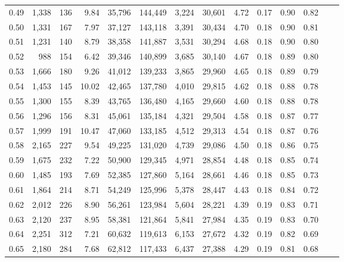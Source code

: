 \begin{tabular}{rrrrrrrrrrrrrr}
0.49 &  1,338 &    136 &    9.84 &   35,796 &  144,449 &   3,224 &  30,601 &  4.72 &  0.17 &  0.90 &      0.82 \\
0.50 &  1,331 &    167 &    7.97 &   37,127 &  143,118 &   3,391 &  30,434 &  4.70 &  0.18 &  0.90 &      0.81 \\
0.51 &  1,231 &    140 &    8.79 &   38,358 &  141,887 &   3,531 &  30,294 &  4.68 &  0.18 &  0.90 &      0.80 \\
0.52 &    988 &    154 &    6.42 &   39,346 &  140,899 &   3,685 &  30,140 &  4.67 &  0.18 &  0.89 &      0.80 \\
0.53 &  1,666 &    180 &    9.26 &   41,012 &  139,233 &   3,865 &  29,960 &  4.65 &  0.18 &  0.89 &      0.79 \\
0.54 &  1,453 &    145 &   10.02 &   42,465 &  137,780 &   4,010 &  29,815 &  4.62 &  0.18 &  0.88 &      0.78 \\
0.55 &  1,300 &    155 &    8.39 &   43,765 &  136,480 &   4,165 &  29,660 &  4.60 &  0.18 &  0.88 &      0.78 \\
0.56 &  1,296 &    156 &    8.31 &   45,061 &  135,184 &   4,321 &  29,504 &  4.58 &  0.18 &  0.87 &      0.77 \\
0.57 &  1,999 &    191 &   10.47 &   47,060 &  133,185 &   4,512 &  29,313 &  4.54 &  0.18 &  0.87 &      0.76 \\
0.58 &  2,165 &    227 &    9.54 &   49,225 &  131,020 &   4,739 &  29,086 &  4.50 &  0.18 &  0.86 &      0.75 \\
0.59 &  1,675 &    232 &    7.22 &   50,900 &  129,345 &   4,971 &  28,854 &  4.48 &  0.18 &  0.85 &      0.74 \\
0.60 &  1,485 &    193 &    7.69 &   52,385 &  127,860 &   5,164 &  28,661 &  4.46 &  0.18 &  0.85 &      0.73 \\
0.61 &  1,864 &    214 &    8.71 &   54,249 &  125,996 &   5,378 &  28,447 &  4.43 &  0.18 &  0.84 &      0.72 \\
0.62 &  2,012 &    226 &    8.90 &   56,261 &  123,984 &   5,604 &  28,221 &  4.39 &  0.19 &  0.83 &      0.71 \\
0.63 &  2,120 &    237 &    8.95 &   58,381 &  121,864 &   5,841 &  27,984 &  4.35 &  0.19 &  0.83 &      0.70 \\
0.64 &  2,251 &    312 &    7.21 &   60,632 &  119,613 &   6,153 &  27,672 &  4.32 &  0.19 &  0.82 &      0.69 \\
0.65 &  2,180 &    284 &    7.68 &   62,812 &  117,433 &   6,437 &  27,388 &  4.29 &  0.19 &  0.81 &      0.68 \\

\end{tabular}
